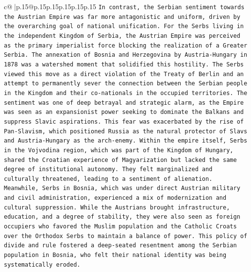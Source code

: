 \documentclass{article}
\begin{document}
{\begin{supertabular}{c@{$\;$}|p{.15\linewidth}@{}p{.15\linewidth}p{.15\linewidth}p{.15\linewidth}p{.15\linewidth}p{.15\linewidth}}
{{{\texttt{In contrast, the Serbian sentiment towards the Austrian Empire was far more antagonistic and uniform, driven by the overarching goal of national unification. For the Serbs living in the independent Kingdom of Serbia, the Austrian Empire was perceived as the primary imperialist force blocking the realization of a Greater Serbia. The annexation of Bosnia and Herzegovina by Austria{-}Hungary in 1878 was a watershed moment that solidified this hostility. The Serbs viewed this move as a direct violation of the Treaty of Berlin and an attempt to permanently sever the connection between the Serbian people in the Kingdom and their co{-}nationals in the occupied territories. The sentiment was one of deep betrayal and strategic alarm, as the Empire was seen as an expansionist power seeking to dominate the Balkans and suppress Slavic aspirations. This fear was exacerbated by the rise of Pan{-}Slavism, which positioned Russia as the natural protector of Slavs and Austria{-}Hungary as the arch{-}enemy. Within the empire itself, Serbs in the Vojvodina region, which was part of the Kingdom of Hungary, shared the Croatian experience of Magyarization but lacked the same degree of institutional autonomy. They felt marginalized and culturally threatened, leading to a sentiment of alienation. Meanwhile, Serbs in Bosnia, which was under direct Austrian military and civil administration, experienced a mix of modernization and cultural suppression. While the Austrians brought infrastructure, education, and a degree of stability, they were also seen as foreign occupiers who favored the Muslim population and the Catholic Croats over the Orthodox Serbs to maintain a balance of power. This policy of divide and rule fostered a deep{-}seated resentment among the Serbian population in Bosnia, who felt their national identity was being systematically eroded.} \\
\\ 
}}}
\end{supertabular}}
\end{document}
